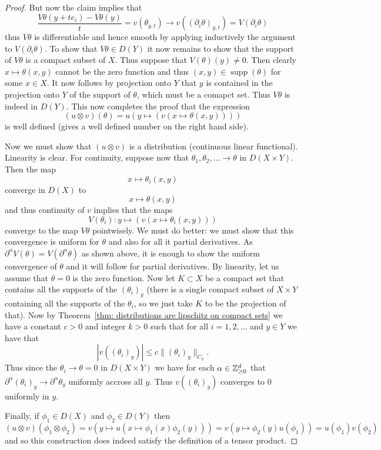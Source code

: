 \documentclass[twoside, a4paper, 10pt]{amsart}
\begin{document}
\begin{proof}
But now the claim implies that $$\frac{V\theta (y+te_i) - V\theta(y)}{t} = v(\theta_{y,t}) \to v((\partial_i\theta)_{y,t}) = V(\partial_i \theta)$$ thus $V\theta$ is differentiable and hence smooth by applying inductively the argument to $V(\partial_i \theta)$. To show that $V\theta \in D(Y)$ it now remains to show that the support of $V\theta$ is a compact subset of $X$. Thus suppose that $V(\theta)(y) \neq 0$. Then clearly $x \mapsto \theta(x,y)$ cannot be the zero function and thus $(x,y) \in \operatorname{supp}(\theta)$ for some $x \in X$. It now follows by projection onto $Y$ that $y$ is contained in the projection onto $Y$ of the support of $\theta$, which must be a comapct set. Thus $V\theta$ is indeed in $D(Y)$. This now completes the proof that the expression $$(u \otimes v)(\theta) = u(y \mapsto (v(x \mapsto \theta(x,y))))$$ is well defined (gives a well defined number on the right hand side). 

Now we must show that $(u \otimes v)$ is a distribution (continuous linear functional). Linearity is clear. For continuity, suppose now that  $\theta_1, \theta_2, \ldots \to \theta$ in $D(X \times Y)$. Then the map $$x \mapsto \theta_i(x,y)$$ converge in $D(X)$ to $$x \mapsto \theta(x,y)$$ and thus continuity of $v$ implies that the maps $$V(\theta_i): y \mapsto (v(x \mapsto \theta_i(x,y)))$$ converge to the map $V\theta$ pointwisely. We must do better: we must show that this convergence is uniform for $\theta$ and also for all it partial derivatives. As $\partial^{\alpha}V(\theta) = V(\partial^{\alpha}\theta)$ as shown above, it is enough to show the uniform convergence of $\theta$ and it will follow for partial derivatives. By linearity, let us assume that $\theta = 0$ is the zero function. Now let $K \subset X$ be a compact set that contains all the supports of the $(\theta_i)_y$ (there is a single compact subset of $X \times Y$ containing all the supports of the $\theta_i$, so we just take $K$ to be the projection of that). Now by Theorem~\ref{thm: distributions are lipschitz on compact sets} we have a constant $c>0$ and integer $k>0$ such that for all $i=1,2,\ldots$ and $y \in Y$ we have that $$ |v((\theta_i)_y)| \leq c\| (\theta_i)_y \|_{C_k} .$$ Thus since the $\theta_i \to \theta = 0$ in $D(X \times Y)$ we have for each $\alpha \in \mathbb{Z}_{\geq 0}^d$ that $\partial^{\alpha} (\theta_i)_y \to \partial^{\alpha} \theta_y $ uniformly accross all $y$. Thus $v((\theta_i)_y)$ converges to $0$ uniformly in $y$.

Finally, if $\phi_1 \in D(X)$ and $\phi_2 \in D(Y)$ then $$(u \otimes v)(\phi_1 \otimes \phi_2) = v(y \mapsto u(x \mapsto \phi_1(x)\phi_2(y))) = v(y \mapsto \phi_2(y) u(\phi_1)) = u(\phi_1)v(\phi_2)$$ and so this construction does indeed satisfy the definition of a tensor product. \end{proof}
\end{document}
